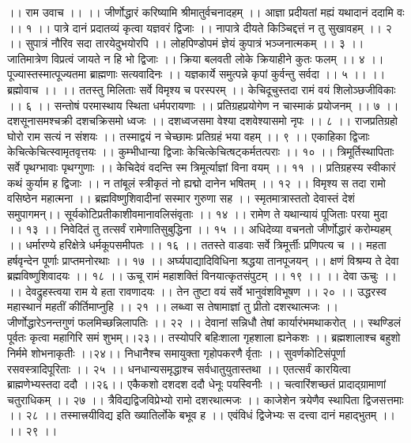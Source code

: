 ।। राम उवाच ।। ।।
जीर्णोद्धारं करिष्यामि श्रीमातुर्वचनादहम् ।।
आज्ञा प्रदीयतां मह्यं यथादानं ददामि वः ।। १ ।।
पात्रे दानं प्रदातव्यं कृत्वा यज्ञवरं द्विजाः ।।
नापात्रे दीयते किञ्चिद्दत्तं न तु सुखावहम् ।। २ ।।
सुपात्रं नौरिव सदा तारयेदुभयोरपि ।।
लोहपिण्डोपमं ज्ञेयं कुपात्रं भञ्जनात्मकम् ।। ३ ।।
जातिमात्रेण विप्रत्वं जायते न हि भो द्विजाः ।।
क्रिया बलवती लोके क्रियाहीने कुतः फलम् ।। ४ ।।
पूज्यास्तस्मात्पूज्यतमा ब्राह्मणाः सत्यवादिनः ।।
यज्ञकार्ये समुत्पन्ने कृपां कुर्वन्तु सर्वदा ।। ५ ।।
।। ब्रह्मोवाच ।। ।।
ततस्तु मिलिताः सर्वे विमृश्य च परस्परम् ।।
केचिदूचुस्तदा रामं वयं शिलोञ्छजीविकाः ।। ६ ।।
सन्तोषं परमास्थाय स्थिता धर्मपरायणाः ।।
प्रतिग्रहप्रयोगेण न चास्माकं प्रयोजनम् ।। ७ ।।
दशसूनासमश्चक्री दशचक्रिसमो ध्वजः ।।
दशध्वजसमा वेश्या दशवेश्यासमो नृपः ।। ८ ।।
राजप्रतिग्रहो घोरो राम सत्यं न संशयः ।।
तस्माद्वयं न चेच्छामः प्रतिग्रहं भया वहम् ।। ९ ।।
एकाहिका द्विजाः केचित्केचित्स्वामृतवृत्तयः ।।
कुम्भीधान्या द्विजाः केचित्केचित्षट्कर्मतत्पराः ।। १० ।।
त्रिमूर्तिस्थापिताः सर्वे पृथग्भावाः पृथग्गुणाः ।।
केचिदेवं वदन्ति स्म त्रिमूर्त्याज्ञां विना वयम् ।। ११ ।।
प्रतिग्रहस्य स्वीकारं कथं कुर्याम ह द्विजाः ।।
न तांबूलं स्त्रीकृतं नो ह्यद्मो दानेन भषितम् ।। १२ ।।
विमृश्य स तदा रामो वसिष्ठेन महात्मना ।।
ब्रह्मविष्णुशिवादीनां सस्मार गुरुणा सह ।।
स्मृतमात्रास्ततो देवास्तं देशं समुपागमन्।।
सूर्यकोटिप्रतीकाशीवमानावलिसंवृताः ।। १४ ।।
रामेण ते यथान्यायं पूजिताः परया मुदा ।। १३ ।।
निवेदितं तु तत्सर्वं रामेणातिसुबुद्धिना ।। १५ ।।
अधिदेव्या वचनतो जीर्णोद्धारं करोम्यहम् ।।
धर्मारण्ये हरिक्षेत्रे धर्मकूपसमीपतः ।। १६ ।।
ततस्ते वाडवाः सर्वे त्रिमूर्त्तीः प्रणिपत्य च ।।
महता हर्षवृन्देन पूर्णाः प्राप्तमनोरथाः ।। १७ ।।
अर्घ्यपाद्यादिविधिना श्रद्धया तानपूजयन् ।।
क्षणं विश्रम्य ते देवा ब्रह्मविष्णुशिवादयः ।। १८ ।।
ऊचू रामं महाशक्तिं विनयात्कृतसंपुटम् ।। १९ ।।
।। देवा ऊचुः ।। ।।
देवद्रुहस्त्वया राम ये हता रावणादयः ।।
तेन तुष्टा वयं सर्वे भानुवंशविभूषण ।। २० ।।
उद्धरस्व महास्थानं महतीं कीर्तिमाप्नुहि ।। २१ ।।
लब्ध्वा स तेषामाज्ञां तु प्रीतो दशरथात्मजः ।।
जीर्णोद्धारेऽनन्तगुणं फलमिच्छन्निलापतिः ।। २२ ।।
देवानां सन्निधौ तेषां कार्यारंभमथाकरोत् ।।
स्थण्डिलं पूर्वतः कृत्वा महागिरि समं शुभम्।।२३।।
तस्योपरि बहिःशाला गृहशाला ह्यनेकशः ।।
ब्रह्मशालाश्च बहुशो निर्ममे शोभनाकृतीः ।।२४।।
निधानैश्च समायुक्ता गृहोपकरणै र्वृताः ।।
सुवर्णकोटिसंपूर्णा रसवस्त्रादिपूरिताः ।। २५ ।।
धनधान्यसमृद्धाश्च सर्वधातुयुतास्तथा ।।
एतत्सर्वं कारयित्वा ब्राह्मणेभ्यस्तदा ददौ ।।२६।।
एकैकशो दशदश ददौ धेनूः पयस्विनीः ।।
चत्वारिंशच्छतं प्रादाद्ग्रामाणां चतुराधिकम् ।। २७ ।।
त्रैविद्यद्विजविप्रेभ्यो रामो दशरथात्मजः ।।
काजेशेन त्रयेणैव स्थापिता द्विजसत्तमाः ।। २८ ।।
तस्मात्त्रयीविद्य इति ख्यातिर्लोके बभूव ह ।।
एवंविधं द्विजेभ्यः स दत्त्वा दानं महाद्भुतम् ।। ।। २९ ।।
